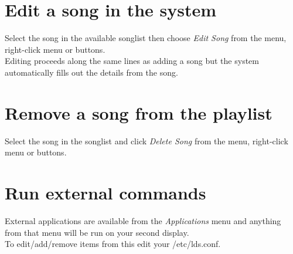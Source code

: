 \documentclass[11pt,twoside]{book}
\begin{document}
\section{Edit a song in the system}
Select the song in the available songlist then choose \emph{Edit Song} from the menu, right-click menu or buttons.\\
Editing proceeds along the same lines as adding a song but the system automatically fills out the details from the song.

\section{Remove a song from the playlist}
Select the song in the songlist and click \emph{Delete Song} from the menu, right-click menu or buttons.

\section{Run external commands}
External applications are available from the \emph{Applications} menu and anything from that menu will be run on your second display.\\
To edit/add/remove items from this edit your /etc/lds.conf.
\end{document}
